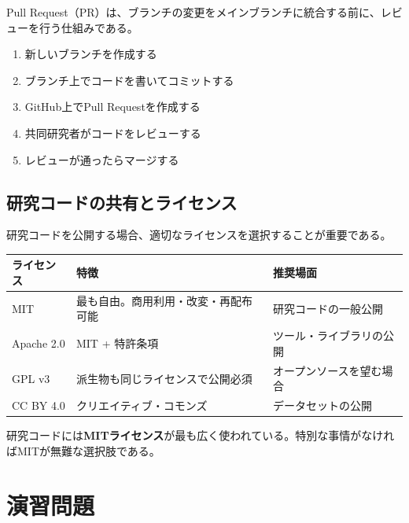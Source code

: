 Pull Request（PR）は、ブランチの変更をメインブランチに統合する前に、レビューを行う仕組みである。

\begin{enumerate}
\item 新しいブランチを作成する
\item ブランチ上でコードを書いてコミットする
\item GitHub上でPull Requestを作成する
\item 共同研究者がコードをレビューする
\item レビューが通ったらマージする
\end{enumerate}

\subsection{研究コードの共有とライセンス}

研究コードを公開する場合、適切なライセンスを選択することが重要である。

\begin{table}[H]
\centering
\footnotesize
\begin{tabular}{lp{4.5cm}l}
\toprule
ライセンス & 特徴 & 推奨場面 \\
\midrule
MIT & 最も自由。商用利用・改変・再配布可能 & 研究コードの一般公開 \\
Apache 2.0 & MIT + 特許条項 & ツール・ライブラリの公開 \\
GPL v3 & 派生物も同じライセンスで公開必須 & オープンソースを望む場合 \\
CC BY 4.0 & クリエイティブ・コモンズ & データセットの公開 \\
\bottomrule
\end{tabular}
\end{table}

研究コードには\textbf{MITライセンス}が最も広く使われている。特別な事情がなければMITが無難な選択肢である。

\section*{演習問題}


